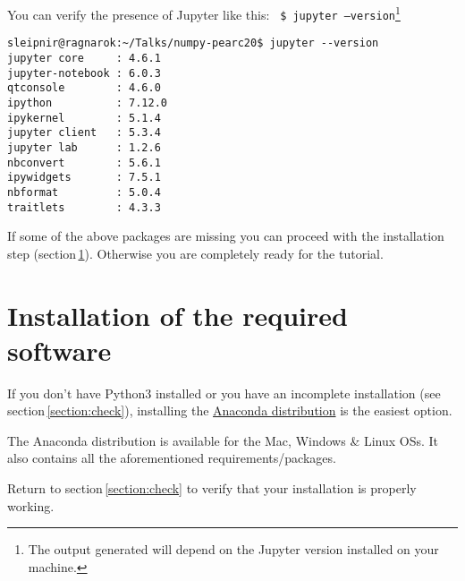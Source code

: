 \documentclass[11pt]{article}
\begin{document}
You can verify the presence of Jupyter like this:\newline\newline
\texttt{
\$ jupyter --version}\footnote{The output generated will depend on the Jupyter version installed on your machine.}
\begin{verbatim}
sleipnir@ragnarok:~/Talks/numpy-pearc20$ jupyter --version
jupyter core     : 4.6.1
jupyter-notebook : 6.0.3
qtconsole        : 4.6.0
ipython          : 7.12.0
ipykernel        : 5.1.4
jupyter client   : 5.3.4
jupyter lab      : 1.2.6
nbconvert        : 5.6.1
ipywidgets       : 7.5.1
nbformat         : 5.0.4
traitlets        : 4.3.3
\end{verbatim}

If some of the above packages are missing you can proceed with 
the installation step (section\,\ref{section:install}). Otherwise 
you are completely ready for the tutorial.
 
\section{Installation of the required software}\label{section:install}
If you don't have Python$3$ installed or you have an incomplete installation 
(see section\,\ref{section:check}),
installing the \href{https://www.anaconda.com/download/}{Anaconda distribution} is 
the easiest option.

The Anaconda distribution is available for the Mac, Windows \& Linux OSs. 
It also contains all the aforementioned requirements/packages.

Return to section\,\ref{section:check} to verify that your installation is properly working.

%
%
\end{document}

